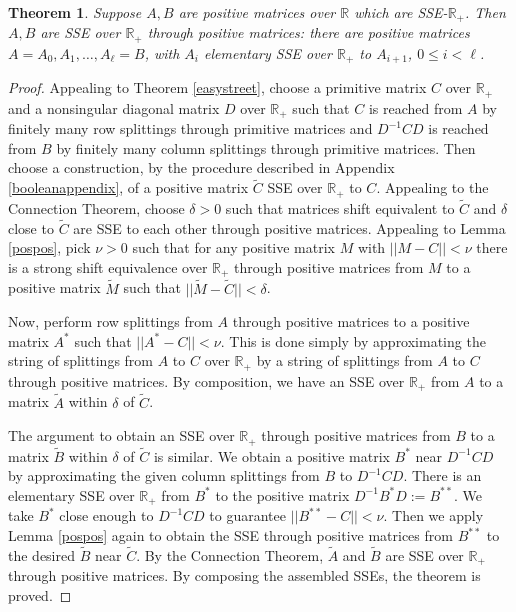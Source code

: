 \documentclass{amsart}
\newtheorem{theorem}{Theorem}[section]
\theoremstyle{definition}
\theoremstyle{remark}
\numberwithin{equation}{section}
\begin{document}
{{\begin{theorem} \label{positivetheorem}
Suppose $A,B$ are positive matrices over $\mathbb R$ which 
are SSE-$\mathbb R_+$. Then 
$A,B$ are SSE over $\mathbb R_+$ through positive matrices: 
there are positive 
matrices  $A=A_0,A_1, \dots , A_{\ell}=B$, with 
$A_i$ elementary SSE over $\mathbb R_+$ to $A_{i+1}$, $0\leq i < \ell$. 
\end{theorem} 


\begin{proof} 
Appealing to Theorem \ref{easystreet},
choose a primitive matrix $C$ over $\mathbb R_+$ 
 and 
a nonsingular diagonal matrix $D$ over $\mathbb R_+$ 
such that $C$ is reached from $A$ by finitely many row splittings 
through  primitive matrices  and 
 $D^{-1}CD$ is reached from $B$ by finitely many column splittings 
through primitive  matrices. 
Then choose a construction, 
by the procedure described  
 in Appendix \ref{booleanappendix}, 
of a positive matrix 
 $\widetilde C$ SSE over $\mathbb R_+$ to $C$. 
Appealing to the Connection 
Theorem, 
choose $\delta >0$ such that 
matrices shift equivalent to 
$\widetilde C$
and 
$\delta $ close to  
$\widetilde C$ are SSE to each other through positive matrices. 
Appealing to Lemma \ref{pospos}, 
pick $\nu >0$ such that for any positive matrix 
$M$  with $||M-C||
< \nu$ there is a strong shift equivalence over 
$\mathbb R_+$ through positive matrices from $M$ to a positive matrix $\widetilde M$ 
 such that $||\widetilde M - \widetilde C||<\delta$. 

Now, perform row splittings from $A$ through positive matrices 
 to a positive matrix $A^*$ such that 
$||A^*-C||<\nu$. This is done simply by approximating 
the string of splittings from $A$ to $C$ over $\mathbb R_+$ by 
a string of splittings 
 from $A$ to $C$  through positive matrices.
By composition, we have an SSE over $\mathbb R_+$ from $A$ to a matrix 
$\widetilde A$ within $\delta$ of $\widetilde C$.  

The argument to obtain
 an SSE over $\mathbb R_+$ through positive matrices from $B$ to a matrix 
$\widetilde B$ within $\delta$ of $\widetilde C$ is similar. 
 We obtain a positive matrix $B^*$ 
near $D^{-1}CD$ by approximating 
the given column splittings from $B$ to $D^{-1}CD$. 
There is an elementary SSE  over $\mathbb R_+$  from 
$B^*$ to the positive matrix $D^{-1}B^*D:=B^{**}$. 
We take $B^*$ close enough to 
$D^{-1}CD$
to guarantee $||B^{**}-C||<\nu$. Then we apply 
 Lemma \ref{pospos} again to obtain the SSE through positive matrices from 
$B^{**}$ to the desired $\widetilde B$ near $\widetilde C$.
By the Connection Theorem, 
$\widetilde A$ and $\widetilde B$ are SSE over $\mathbb R_+$ through 
positive matrices. By composing the assembled SSEs, the theorem is proved.
\end{proof} 

}}
\end{document}
